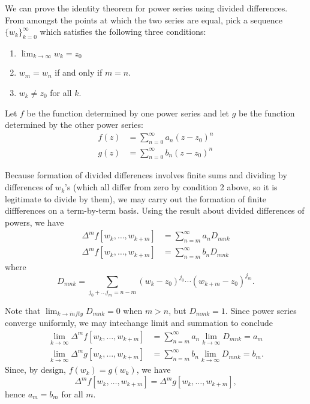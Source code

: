 \documentclass[12pt]{article}
\begin{document}
We can prove the identity theorem for power series
using divided differences.  From amongst the points
at which the two series are equal, pick a sequence
$\{w_k\}_{k=0}^\infty$ which satisfies the following
three conditions:
\begin{enumerate}
\item $\lim_{k \to \infty} w_k = z_0$
\item $w_m = w_n$ if and only if $m = n$.
\item $w_k \neq z_0$ for all $k$.
\end{enumerate}
Let $f$ be the function determined by one power series 
and let $g$ be the function determined by the other
power series:
\begin{align*}
f(z) &= \sum_{n=0}^\infty a_n (z - z_0)^n \\
g(z) &= \sum_{n=0}^\infty b_n (z - z_0)^n
\end{align*}

Because formation of divided differences involves
finite sums and dividing by differences of $w_k$'s
(which all differ from zero by condition 2 above,
so it is legitimate to divide by them), we may
carry out the formation of finite diffferences
on a term-by-term basis.  Using the result about
divided differences of powers, we have
\begin{align*}
\Delta^m f [w_k, \ldots, w_{k+m}] &=
\sum_{n=m}^\infty a_n D_{mnk} \\
\Delta^m f [w_k, \ldots, w_{k+m}] &=
\sum_{n=m}^\infty b_n D_{mnk}
\end{align*}
where
\[
D_{mnk} = \sum_{j_0 + \ldots j_m = n - m}
(w_k - z_0)^{j_0} \cdots (w_{k+m} - z_0)^{j_m}.
\]

Note that $\lim_{k \to infty} D_{mnk} = 0$
when $m > n$, but $D_{mmk} = 1$.  Since
power series converge uniformly, we may
intechange limit and summation to conclude
\begin{align*}
\lim_{k \to \infty} \Delta^m f [w_k, \ldots, w_{k+m}] &=
\sum_{n=m}^\infty a_n \lim_{k \to \infty} D_{mnk} = a_m \\
\lim_{k \to \infty} \Delta^m g [w_k, \ldots, w_{k+m}] &=
\sum_{n=m}^\infty b_n \lim_{k \to \infty} D_{mnk} = b_m.
\end{align*}
Since, by design, $f(w_k) = g(w_k)$, we have
\[
\Delta^m f [w_k, \ldots, w_{k+m}] = 
\Delta^m g [w_k, \ldots, w_{k+m}],
\]
hence $a_m = b_m$ for all $m$.
\end{document}
